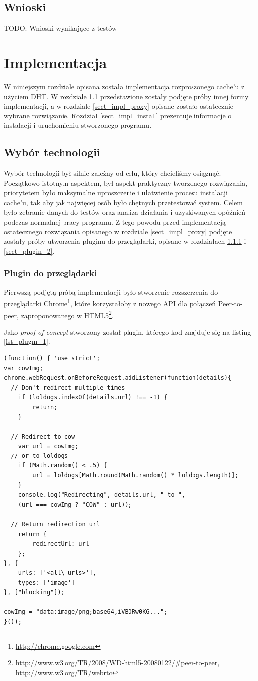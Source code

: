 \documentclass[a4paper,11pt]{scrartcl}
\newcommand{\s}{ }
\newcommand{\keszu}{cache'u}
\begin{document}
\subsection{Wnioski}
TODO: Wnioski wynikające z testów

\section{Implementacja}
W niniejszym rozdziale opisana została implementacja rozproszonego \keszu\s z użyciem DHT. W rozdziale \ref{sect_impl_technology}
przedstawione zostały podjęte próby innej formy implementacji, a w rozdziale \ref{sect_impl_proxy} opisane zostało ostatecznie wybrane rozwiązanie.
Rozdział \ref{sect_impl_install} prezentuje informacje o instalacji i uruchomieniu stworzonego programu.

\subsection{Wybór technologii}
\label{sect_impl_technology}
Wybór technologii był silnie zależny od celu, który chcieliśmy osiągnąć. Początkowo istotnym aspektem, był aspekt praktyczny tworzonego rozwiązania, priorytetem było maksymalne uproszczenie i ułatwienie procesu instalacji \keszu, tak aby jak najwięcej osób było chętnych przetestować system. Celem było zebranie danych do testów oraz analiza działania i uzyskiwanych opóźnień podczas normalnej pracy programu. Z tego powodu przed implementacją ostatecznego rozwiązania opisanego w rozdziale \ref{sect_impl_proxy} podjęte zostały próby utworzenia pluginu do przeglądarki, opisane w rozdziałach \ref{sect_plugin_1} i \ref{sect_plugin_2}.

\subsubsection{Plugin do przeglądarki}
\label{sect_plugin_1}
Pierwszą podjętą próbą implementacji było stworzenie rozszerzenia do przeglądarki Chrome\footnote{\url{http://chrome.google.com}}, które korzystałoby z nowego API dla połączeń Peer-to-peer, zaproponowanego w HTML5\footnote{\url{http://www.w3.org/TR/2008/WD-html5-20080122/#peer-to-peer}, \url{http://www.w3.org/TR/webrtc}}.

Jako \textit{proof-of-concept} stworzony został plugin, którego kod znajduje się na listing \ref{lst_plugin_1}.

\begin{lstlisting}
(function() { 'use strict';
var cowImg;
chrome.webRequest.onBeforeRequest.addListener(function(details){
  // Don't redirect multiple times
	if (loldogs.indexOf(details.url) !== -1) {
		return;
	}
  
  // Redirect to cow
	var url = cowImg;
  // or to loldogs
	if (Math.random() < .5) {
		url = loldogs[Math.round(Math.random() * loldogs.length)];
	}
	console.log("Redirecting", details.url, " to ", 
    (url === cowImg ? "COW" : url));

  // Return redirection url
	return {
		redirectUrl: url
	};
}, {
	urls: ['<all\_urls>'],
	types: ['image']
}, ["blocking"]);

cowImg = "data:image/png;base64,iVBORw0KG...";
}());
\end{lstlisting}
\end{document}
